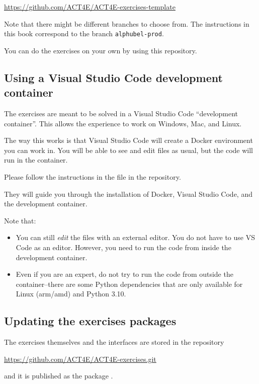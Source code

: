 \url{https://github.com/ACT4E/ACT4E-exercises-template}

Note that there might be different branches to choose from.
The instructions in this book correspond to the branch \texttt{alphubel-prod}.

You can do the exercises on your own by using this repository.
%

\subsection{Using a Visual Studio Code development container}

The exercises are meant to be solved in a Visual Studio Code ``development container''.
This allows the experience to work on Windows, Mac, and Linux.

The way this works is that Visual Studio Code will create a Docker environment you can work in.
You will be able to see and edit files as usual, but the code will run in the container.

Please follow the instructions in the  file in the repository.

They will guide you through the installation of Docker, Visual Studio Code, and the development container.

Note that:

\begin{itemize}
    \item You can still \emph{edit} the files with an external editor.
          You do not have to use VS Code as an editor.
          However, you need to run the code from inside the development container.
    \item Even if you are an expert, do not try to run the code from outside the container--there are some Python dependencies that are only available for Linux (arm/amd) and Python 3.10.
\end{itemize}

\subsection{Updating the exercises packages}

The exercises themselves and the interfaces are stored in the repository

\url{https://github.com/ACT4E/ACT4E-exercises.git}

and it is published as the package .

